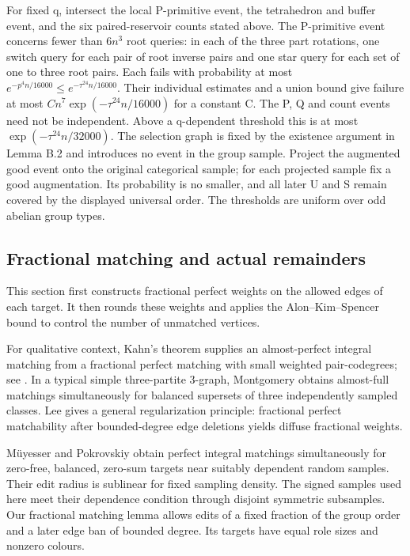 \documentclass[11pt,a4paper]{article}
\begin{document}
For fixed q, intersect the local P-primitive event, the tetrahedron and buffer event, and the six paired-reservoir counts stated above. The P-primitive event concerns fewer than \(6n^3\) root queries: in each of the three part rotations, one switch query for each pair of root inverse pairs and one star query for each set of one to three root pairs. Each fails with probability at most \(e^{-p^4n/16000}\le e^{-\tau^{24}n/16000}\). Their individual estimates and a union bound give failure at most \(C n^7 \exp(-\tau^{24} n/16000)\) for a constant C. The P, Q and count events need not be independent. Above a q-dependent threshold this is at most \(\exp(-\tau^{24} n/32000)\). The selection graph is fixed by the existence argument in Lemma B.2 and introduces no event in the group sample. Project the augmented good event onto the original categorical sample; for each projected sample fix a good augmentation. Its probability is no smaller, and all later U and S remain covered by the displayed universal order. The thresholds are uniform over odd abelian group types.

\hypertarget{fractional-matching-and-actual-remainders}{%
\subsection{Fractional matching and actual remainders}\label{fractional-matching-and-actual-remainders}}

This section first constructs fractional perfect weights on the allowed edges of each target. It then rounds these weights and applies the Alon--Kim--Spencer bound to control the number of unmatched vertices.

For qualitative context, Kahn's theorem \cite{Kah96} supplies an almost-perfect integral matching from a fractional perfect matching with small weighted pair-codegrees; see \cite[Theorem 5.17]{Kee11}. In a typical simple three-partite 3-graph, Montgomery \cite[Theorem 4.1]{Mon23} obtains almost-full matchings simultaneously for balanced supersets of three independently sampled classes. Lee \cite[Lemma 4.2]{Lee25} gives a general regularization principle: fractional perfect matchability after bounded-degree edge deletions yields diffuse fractional weights.

Müyesser and Pokrovskiy \cite[Theorem 4.3]{MP25} obtain perfect integral matchings simultaneously for zero-free, balanced, zero-sum targets near suitably dependent random samples. Their edit radius is sublinear for fixed sampling density. The signed samples used here meet their dependence condition through disjoint symmetric subsamples. Our fractional matching lemma allows edits of a fixed fraction of the group order and a later edge ban of bounded degree. Its targets have equal role sizes and nonzero colours.
\end{document}
